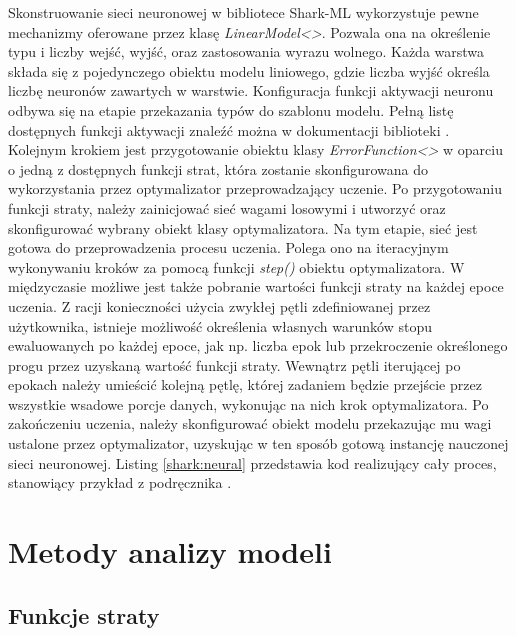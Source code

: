 Skonstruowanie sieci neuronowej w bibliotece Shark-ML wykorzystuje pewne mechanizmy oferowane przez klasę \textit{LinearModel<>}. Pozwala ona na określenie typu i liczby wejść, wyjść, oraz zastosowania wyrazu wolnego. Każda warstwa składa się z pojedynczego obiektu modelu liniowego, gdzie liczba wyjść określa liczbę neuronów zawartych w warstwie. Konfiguracja funkcji aktywacji neuronu odbywa się na etapie przekazania typów do szablonu modelu. Pełną listę dostępnych funkcji aktywacji znaleźć można w dokumentacji biblioteki \cite{shark:activation}. Kolejnym krokiem jest przygotowanie obiektu klasy \textit{ErrorFunction<>} w oparciu o jedną z dostępnych funkcji strat, która zostanie skonfigurowana do wykorzystania przez optymalizator przeprowadzający uczenie. Po przygotowaniu funkcji straty, należy zainicjować sieć wagami losowymi i utworzyć oraz skonfigurować wybrany obiekt klasy optymalizatora. Na tym etapie, sieć jest gotowa do przeprowadzenia procesu uczenia. Polega ono na iteracyjnym wykonywaniu kroków za pomocą funkcji \textit{step()} obiektu optymalizatora. W międzyczasie możliwe jest także pobranie wartości funkcji straty na każdej epoce uczenia. Z racji konieczności użycia zwykłej pętli zdefiniowanej przez użytkownika, istnieje możliwość określenia własnych warunków stopu ewaluowanych po każdej epoce, jak np. liczba epok lub przekroczenie określonego progu przez uzyskaną wartość funkcji straty. Wewnątrz pętli iterującej po epokach należy umieścić kolejną pętlę, której zadaniem będzie przejście przez wszystkie wsadowe porcje danych, wykonując na nich krok optymalizatora. Po zakończeniu uczenia, należy skonfigurować obiekt modelu przekazując mu wagi ustalone przez optymalizator, uzyskując w ten sposób gotową instancję nauczonej sieci neuronowej. Listing \ref{shark:neural} przedstawia kod realizujący cały proces, stanowiący przykład z podręcznika \cite{handsOnMachineLearning}.


\section{Metody analizy modeli}

\subsection{Funkcje straty}


